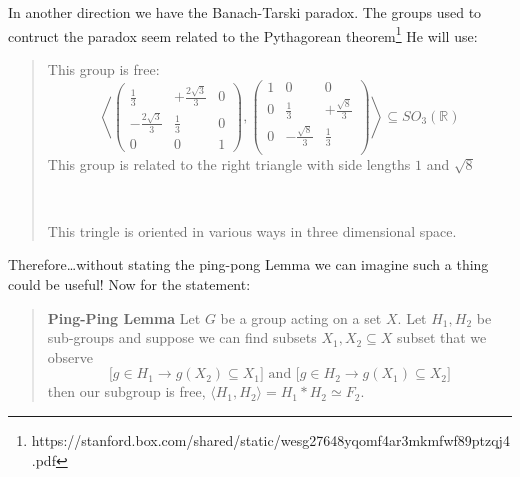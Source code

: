 \documentclass[12pt]{article}
\begin{document}
In another direction we have the Banach-Tarski paradox.  The groups used to contruct the paradox seem related to the Pythagorean theorem\footnote{https://stanford.box.com/shared/static/wesg27648yqomf4ar3mkmfwf89ptzqj4.pdf} He will use:
\begin{quotation}\noindent This group is free:
$$  \left\langle \left( \begin{array}{ccc} \frac{1}{3} & +\frac{2 \sqrt{3}}{3} & 0 \\
-\frac{2 \sqrt{3}}{3} &  \frac{1}{3} &  0 \\
0 & 0 & 1
\end{array}\right) , 
\left( \begin{array}{ccc}
1 & 0 & 0  \\
0 &  \frac{1}{3} & +\frac{\sqrt{8}}{3}  \\
0 & -\frac{ \sqrt{8}}{3} &  \frac{1}{3}  \\
\end{array}\right) 
\right\rangle \subseteq SO_3(\mathbb{R})$$
This group is related to the right triangle with side lengths $1$ and $\sqrt{8}$\\
\begin{center}
 \\
\end{center}
This tringle is oriented in various ways in three dimensional space.
\end{quotation}
Therefore\dots without stating the ping-pong Lemma we can imagine such a thing could be useful!  Now for the statement:
\begin{quotation}\noindent 
\textbf{\color{red!50!white}Ping-Ping Lemma} {\color{green!50!blue} Let $G$ be a group acting on a set $X$.  Let $H_1, H_2$ be sub-groups and suppose we can find subsets $X_1, X_2 \subseteq X$ subset that we observe
$$
\big[ g \in H_1 \to g(X_2) \subseteq X_1 \big] \text{ and }
\big[ g \in H_2 \to g(X_1) \subseteq X_2 \big] $$   
then our subgroup is free, $\langle H_1, H_2 \rangle = H_1 \ast H_2 \simeq F_2$}.
\end{quotation}
\end{document}
